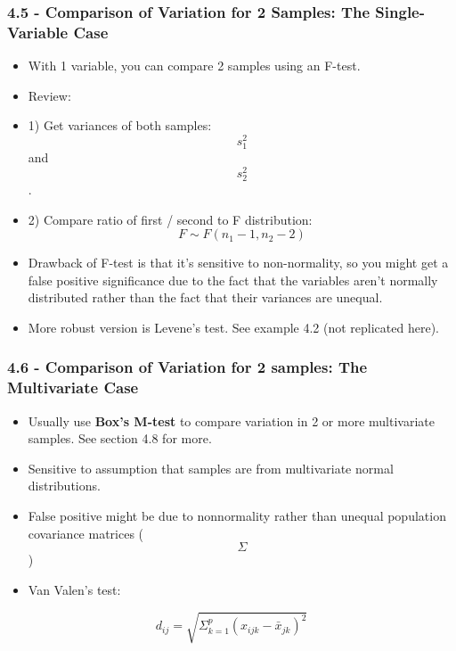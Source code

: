 \hypertarget{comparison-of-variation-for-2-samples-the-single-variable-case}{%
\subsubsection{4.5 - Comparison of Variation for 2 Samples: The
Single-Variable
Case}\label{comparison-of-variation-for-2-samples-the-single-variable-case}}

\begin{itemize}
\tightlist
\item
  With 1 variable, you can compare 2 samples using an F-test.
\item
  Review:
\item
  1) Get variances of both samples: \[s_1^2\] and \[s_2^2\].
\item
  2) Compare ratio of first / second to F distribution:
  \[ F \sim F(n_1 - 1, n_2 - 2) \]
\item
  Drawback of F-test is that it's sensitive to non-normality, so you
  might get a false positive significance due to the fact that the
  variables aren't normally distributed rather than the fact that their
  variances are unequal.
\item
  More robust version is Levene's test. See example 4.2 (not replicated
  here).
\end{itemize}

\hypertarget{comparison-of-variation-for-2-samples-the-multivariate-case}{%
\subsubsection{4.6 - Comparison of Variation for 2 samples: The
Multivariate
Case}\label{comparison-of-variation-for-2-samples-the-multivariate-case}}

\begin{itemize}
\tightlist
\item
  Usually use \textbf{Box's M-test} to compare variation in 2 or more
  multivariate samples. See section 4.8 for more.
\item
  Sensitive to assumption that samples are from multivariate normal
  distributions.
\item
  False positive might be due to nonnormality rather than unequal
  population covariance matrices (\[\Sigma\])
\item
  Van Valen's test:
\end{itemize}

\[d_{ij} = \sqrt{\Sigma_{k = 1}^p (x_{ijk} - \bar{x}_{jk})^2}\]

